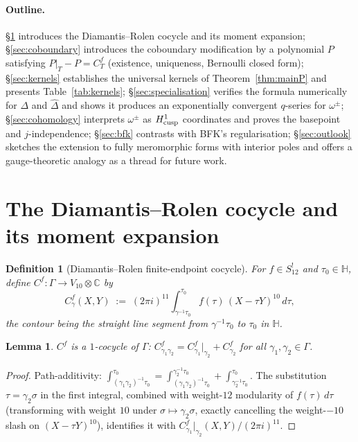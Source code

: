 \documentclass[11pt,letterpaper]{article}
\newtheorem{lemma}[theorem]{Lemma}
\newtheorem{definition}[theorem]{Definition}
\newcommand{\HH}{\mathbb{H}}
\newcommand{\CC}{\mathbb{C}}
\newcommand{\Dhat}{\widehat{\Delta}}
\begin{document}
\paragraph{Outline.}
\S\ref{sec:DR-cocycle} introduces the Diamantis--Rolen cocycle and its
moment expansion; \S\ref{sec:coboundary} introduces the coboundary
modification by a polynomial $P$ satisfying $P|_T - P = C^f_T$
(existence, uniqueness, Bernoulli closed form); \S\ref{sec:kernels}
establishes the universal kernels of Theorem~\ref{thm:mainP} and presents
Table~\ref{tab:kernels}; \S\ref{sec:specialisation} verifies the formula
numerically for $\Delta$ and $\Dhat$ and shows it produces an
exponentially convergent $q$-series for $\omega^\pm$;
\S\ref{sec:cohomology} interprets $\omega^\pm$ as $H^1_{\rm cusp}$
coordinates and proves the basepoint and $j$-independence;
\S\ref{sec:bfk} contrasts with BFK's regularisation; \S\ref{sec:outlook}
sketches the extension to fully meromorphic forms with interior poles
and offers a gauge-theoretic analogy as a thread for future work.

\section{The Diamantis--Rolen cocycle and its moment expansion}\label{sec:DR-cocycle}

\begin{definition}[Diamantis--Rolen finite-endpoint cocycle]\label{def:DR}
For $f \in S_{12}^!$ and $\tau_0 \in \HH$, define
$C^f \colon \Gamma \to V_{10}\otimes\CC$ by
\begin{equation}\label{eq:DR-def}
  C^f_\gamma(X, Y) \;:=\; (2\pi i)^{11}\!\int_{\gamma^{-1}\tau_0}^{\tau_0}\!
                          f(\tau)\,(X - \tau Y)^{10}\,d\tau,
\end{equation}
the contour being the straight line segment from $\gamma^{-1}\tau_0$ to
$\tau_0$ in $\HH$.
\end{definition}

\begin{lemma}\label{lem:DR-cocycle}
$C^f$ is a $1$-cocycle of $\Gamma$:
$C^f_{\gamma_1\gamma_2} = C^f_{\gamma_1}|_{\gamma_2} + C^f_{\gamma_2}$
for all $\gamma_1, \gamma_2 \in \Gamma$.
\end{lemma}

\begin{proof}
Path-additivity:
$\int_{(\gamma_1\gamma_2)^{-1}\tau_0}^{\tau_0} =
 \int_{(\gamma_1\gamma_2)^{-1}\tau_0}^{\gamma_2^{-1}\tau_0}
 + \int_{\gamma_2^{-1}\tau_0}^{\tau_0}$.
The substitution $\tau = \gamma_2\sigma$ in the first integral, combined
with weight-$12$ modularity of $f(\tau)\,d\tau$ (transforming with
weight $10$ under $\sigma \mapsto \gamma_2\sigma$, exactly cancelling
the weight-$-10$ slash on $(X-\tau Y)^{10}$), identifies it with
$C^f_{\gamma_1}|_{\gamma_2}(X, Y)/(2\pi i)^{11}$.
\end{proof}
\end{document}
